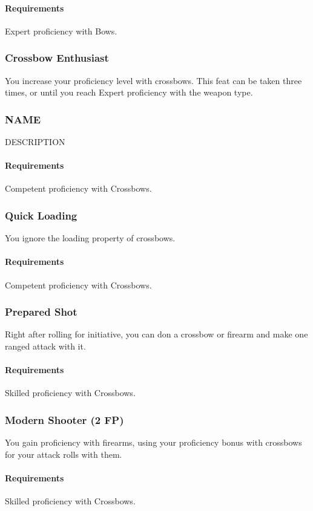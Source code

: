     \paragraph{Requirements} Expert proficiency with Bows.
\subsubsection{Crossbow Enthusiast} \label{feat::crossbowenthusiast}
    You increase your proficiency level with crossbows.
    This feat can be taken three times, or until you reach Expert proficiency with the weapon type.
\subsubsection{NAME} \label{feat::name}
    DESCRIPTION
    \paragraph{Requirements} Competent proficiency with Crossbows.
\subsubsection{Quick Loading} \label{feat::quickloading}
    You ignore the loading property of crossbows.
    \paragraph{Requirements} Competent proficiency with Crossbows.
\subsubsection{Prepared Shot} \label{feat::preparedshot}
    Right after rolling for initiative, you can don a crossbow or firearm and make one ranged attack with it.
    \paragraph{Requirements} Skilled proficiency with Crossbows.
\subsubsection{Modern Shooter (2 FP)} \label{feat::modernshooter}
    You gain proficiency with firearms, using your proficiency bonus with crossbows for your attack rolls with them.
    \paragraph{Requirements} Skilled proficiency with Crossbows.
